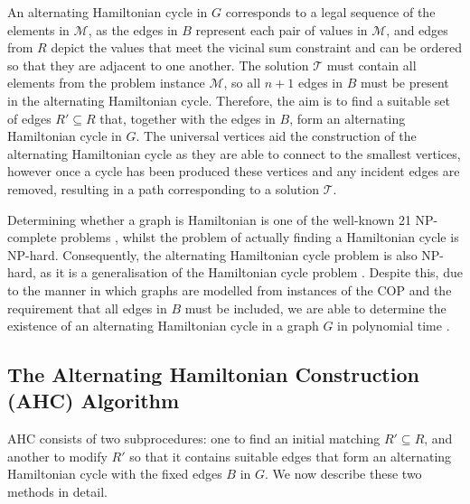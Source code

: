 \documentclass[authoryear]{elsarticle}
\begin{document}
\noindent An alternating Hamiltonian cycle in $G$ corresponds to a legal sequence of the elements in $\mathcal{M}$, as the edges in $B$ represent each pair of values in $\mathcal{M}$, and edges from $R$ depict the values that meet the vicinal sum constraint and can be ordered so that they are adjacent to one another. The solution $\mathcal{T}$ must contain all elements from the problem instance $\mathcal{M}$, so all $n+1$ edges in $B$ must be present in the alternating Hamiltonian cycle. Therefore, the aim is to find a suitable set of edges $R' \subseteq R$ that, together with the edges in $B$, form an alternating Hamiltonian cycle in $G$. The universal vertices aid the construction of the alternating Hamiltonian cycle as they are able to connect to the smallest vertices, however once a cycle has been produced these vertices and any incident edges are removed, resulting in a path corresponding to a solution $\mathcal{T}$.

Determining whether a graph is Hamiltonian is one of the well-known 21 NP-complete problems \cite{karp1972}, whilst the problem of actually finding a Hamiltonian cycle is NP-hard. Consequently, the alternating Hamiltonian cycle problem is also NP-hard, as it is a generalisation of the Hamiltonian cycle problem \citep{haggkvist1977}. Despite this, due to the manner in which graphs are modelled from instances of the COP and the requirement that all edges in $B$ must be included, we are able to determine the existence of an alternating Hamiltonian cycle in a graph $G$ in polynomial time \citep{hawa2018}.

\subsection{The Alternating Hamiltonian Construction (AHC) Algorithm}
\label{sub:ahc}
\noindent AHC consists of two subprocedures: one to find an initial matching $R' \subseteq R$, and another to modify $R'$ so that it contains suitable edges that form an alternating Hamiltonian cycle with the fixed edges $B$ in $G$. We now describe these two methods in detail.
\end{document}
